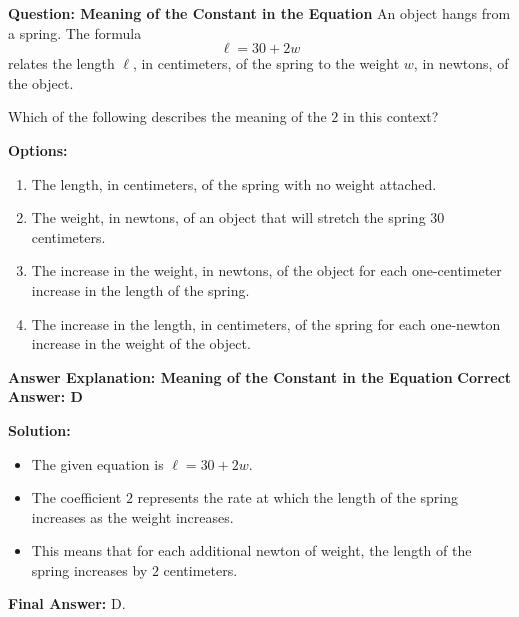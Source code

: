 \documentclass{beamer}
\begin{document}
\begin{frame}{\textbf{Question: Meaning of the Constant in the Equation}}
    An object hangs from a spring. The formula
    \[
    \ell = 30 + 2w
    \]
    relates the length \( \ell \), in centimeters, of the spring to the weight \( w \), in newtons, of the object.

    Which of the following describes the meaning of the \( 2 \) in this context?

    \vspace{0.5cm}
    \textbf{Options:}
    \begin{enumerate}
        \item[A.] The length, in centimeters, of the spring with no weight attached.
        \item[B.] The weight, in newtons, of an object that will stretch the spring 30 centimeters.
        \item[C.] The increase in the weight, in newtons, of the object for each one-centimeter increase in the length of the spring.
        \item[D.] The increase in the length, in centimeters, of the spring for each one-newton increase in the weight of the object.
    \end{enumerate}
\end{frame}

\begin{frame}{\textbf{Answer Explanation: Meaning of the Constant in the Equation}}
    \textbf{Correct Answer: \textcolor{novelPurple}{\( \mathbf{D} \)}}  

    \vspace{0.3cm}
    \textbf{Solution:}
    \begin{itemize}
        \item The given equation is \( \ell = 30 + 2w \).
        \item The coefficient \( 2 \) represents the rate at which the length of the spring increases as the weight increases.
        \item This means that for each additional newton of weight, the length of the spring increases by \( 2 \) centimeters.
    \end{itemize}

    \textbf{Final Answer:} \( \boxed{\text{D}} \).
\end{frame}
\end{document}
